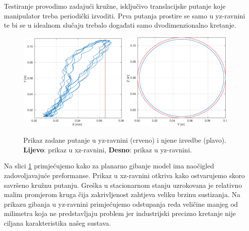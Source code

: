\documentclass[times, utf8, diplomski, numeric]{fer}
\begin{document}
Testiranje provodimo zadajući kružne, isključivo translacijske putanje koje manipulator treba periodički izvoditi.
Prva putanja prostire se samo u yz-ravnini te bi se u idealnom slučaju trebalo događati samo dvodimenzionalno kretanje.
\begin{figure}[h!]
\centering
\includegraphics[width=0.49\textwidth]{xz_krug}
\includegraphics[width=0.49\textwidth]{yz_krug}
\caption{Prikaz zadane putanje u yz-ravnini (crveno) i njene izvedbe (plavo). \textbf{Lijevo}: prikaz u xz-ravnini, \textbf{Desno}: prikaz u yz-ravnini.} \label{krug_1}
\end{figure}
Na slici \ref{krug_1} primjećujemo kako za planarno gibanje model ima naočigled zadovoljavajuće preformanse.
Prikaz u xz-ravnini otkriva kako ostvarujemo skoro savršeno kružnu putanju. Greška u stacionarnom stanju uzrokovana je relativno malim promjerom kruga čija zakrivljenost zahtjeva veliku brzinu sustizanja.
Na prikazu gibanja u yz-ravnini primjećujemo odstupanja reda veličine manjeg od milimetra koja ne predstavljaju problem jer industrijski precizno kretanje nije ciljana karakteristika našeg sustava.
\end{document}
